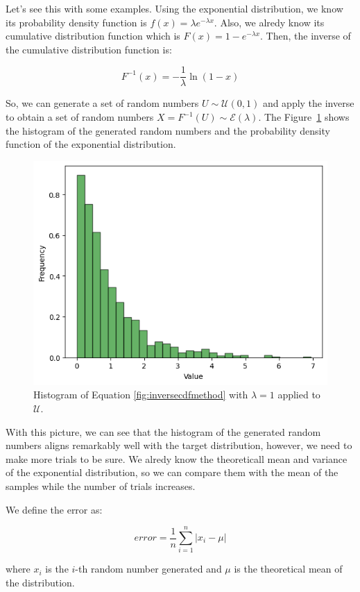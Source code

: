\documentclass{article}
\begin{document}
Let's see this with some examples. Using the exponential distribution, we know its probability density function is \(f(x) = \lambda e^{-\lambda x}\).  Also, we alredy know its cumulative distribution function which is \(F(x) = 1 - e^{-\lambda x}\). Then, the inverse of the cumulative distribution function is:

\begin{equation}\label{eq:inversecdf} F^{-1}(x) = -\frac{1}{\lambda} \ln(1-x) \end{equation}

So, we can generate a set of random numbers \(U \sim \mathcal{U}(0,1)\) and apply the inverse to obtain a set of random numbers \(X = F^{-1}(U) \sim \mathcal{E}(\lambda)\). The Figure~\ref{fig:inversecdfmethod} shows the histogram of the generated random numbers and the probability density function of the exponential distribution.

\begin{figure}[H]
	\centering
	\includegraphics[width=0.5\linewidth]{./Figures/InverseCDF/histogram.png}
	\caption{Histogram of Equation \eqref{fig:inversecdfmethod} with \(\lambda = 1\) applied to \(\mathcal{U}\).}
	\label{fig:inversecdfmethod}
\end{figure}

With this picture, we can see that the histogram of the generated random numbers aligns remarkably well with the target distribution, however, we need to make more trials to be sure. We alredy know the theoreticall mean and variance of the exponential distribution, so we can compare them with the mean of the samples while the number of trials increases.

We define the error as:

\begin{equation*} error = \frac{1}{n}\sum_{i=1}^{n} | x_i - \mu | \end{equation*}

where \(x_i\) is the \(i\)-th random number generated and \(\mu\) is the theoretical mean of the distribution.
\end{document}
